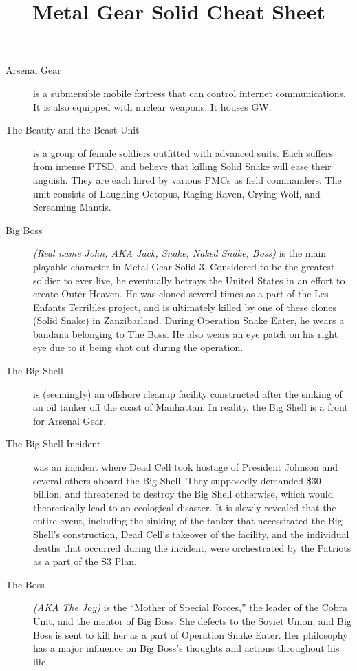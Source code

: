 \documentclass[12pt]{article}
\title{Metal Gear Solid Cheat Sheet}
\date{}
\begin{document}
\maketitle
\begin{description}
	\item [Arsenal Gear] is a submersible mobile fortress that can control
		internet communications. It is also equipped with nuclear
		weapons. It houses GW.

	\item [The Beauty and the Beast Unit] is a group of female soldiers
		outfitted with advanced suits. Each suffers from intense PTSD,
		and believe that killing Solid Snake will ease their anguish.
		They are each hired by various PMCs as field commanders. The
		unit consists of Laughing Octopus, Raging Raven, Crying Wolf,
		and Screaming Mantis.

	\item [Big Boss] \textit{(Real name John, AKA Jack, Snake, Naked Snake,
		Boss)} is the main playable character in Metal Gear Solid 3.
		Considered to be the greatest soldier to ever live, he
		eventually betrays the United States in an effort to create
		Outer Heaven. He was cloned several times as a part of the Les
		Enfants Terribles project, and is ultimately killed by one of
		these clones (Solid Snake) in Zanzibarland. During Operation
		Snake Eater, he wears a bandana belonging to The Boss. He also
		wears an eye patch on his right eye due to it being shot out
		during the operation.
	
	\item [The Big Shell] is (seemingly) an offshore cleanup facility
		constructed after the sinking of an oil tanker off the coast of
		Manhattan. In reality, the Big Shell is a front for Arsenal
		Gear.

	\item [The Big Shell Incident] was an incident where Dead Cell took
		hostage of President Johnson and several others aboard the Big
		Shell. They supposedly demanded \$30 billion, and threatened to
		destroy the Big Shell otherwise, which would theoretically lead
		to an ecological disaster. It is slowly revealed that the
		entire event, including the sinking of the tanker that
		necessitated the Big Shell's construction, Dead Cell's takeover
		of the facility, and the individual deaths that occurred during
		the incident, were orchestrated by the Patriots as a part of
		the S3 Plan.

	\item [The Boss] \textit{(AKA The Joy)} is the ``Mother of Special
		Forces,'' the leader of the Cobra Unit, and the mentor of Big
		Boss. She defects to the Soviet Union, and Big Boss is sent to
		kill her as a part of Operation Snake Eater. Her philosophy has
		a major influence on Big Boss's thoughts and actions throughout
		his life.


\end{description}
\end{document}
